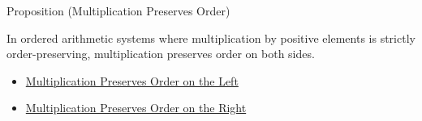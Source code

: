 \begin{propositionbox}{Proposition (Multiplication Preserves Order)}
\begin{proposition}
\label{prop:multiplication-order-compatibility}
In ordered arithmetic systems where multiplication by positive elements is
strictly order-preserving, multiplication preserves order on both sides.
\end{proposition}
\end{propositionbox}

\begin{dependencies}
\begin{itemize}
  \item \hyperref[prop:multiplication-order-compatibility-left]{Multiplication Preserves Order on the Left}
  \item \hyperref[prop:multiplication-order-compatibility-right]{Multiplication Preserves Order on the Right}
\end{itemize}
\end{dependencies}
